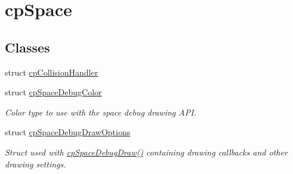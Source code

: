 \hypertarget{group__cpSpace}{}\section{cp\+Space}
\label{group__cpSpace}
\subsection*{Classes}
\begin{DoxyCompactItemize}
\item 
struct \hyperlink{structcpCollisionHandler}{cp\+Collision\+Handler}
\item 
struct \hyperlink{structcpSpaceDebugColor}{cp\+Space\+Debug\+Color}
\begin{DoxyCompactList}\small\item\em Color type to use with the space debug drawing A\+PI. \end{DoxyCompactList}\item 
struct \hyperlink{structcpSpaceDebugDrawOptions}{cp\+Space\+Debug\+Draw\+Options}
\begin{DoxyCompactList}\small\item\em Struct used with \hyperlink{group__cpSpace_ga02e8a34681aff3f29bd976e830f3b6da}{cp\+Space\+Debug\+Draw()} containing drawing callbacks and other drawing settings. \end{DoxyCompactList}\end{DoxyCompactItemize}

